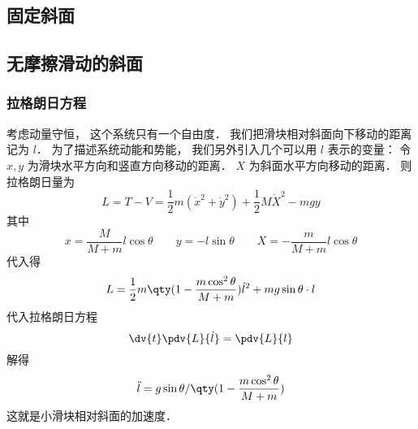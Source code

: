 
\subsection{固定斜面}

\subsection{无摩擦滑动的斜面}

\subsubsection{拉格朗日方程}
考虑动量守恒， 这个系统只有一个自由度． 我们把滑块相对斜面向下移动的距离记为 $l$． 为了描述系统动能和势能， 我们另外引入几个可以用 $l$ 表示的变量： 令 $x, y$ 为滑块水平方向和竖直方向移动的距离． $X$ 为斜面水平方向移动的距离． 则拉格朗日量为
\begin{equation}
L = T - V = \frac12 m(\dot x^2 + \dot y^2) + \frac12 M \dot X^2 - mgy
\end{equation}
其中
\begin{equation}
x = \frac{M}{M + m}l\cos\theta
\qquad
y = -l\sin\theta
\qquad
X = -\frac{m}{M + m}l\cos\theta
\end{equation}
代入得
\begin{equation}
L = \frac{1}{2}m \qty(1 - \frac{m\cos^2\theta}{M + m}) \dot l^2 + mg\sin\theta \cdot l
\end{equation}
代入拉格朗日方程
\begin{equation}
\dv{t} \pdv{L}{\dot l} = \pdv{L}{l}
\end{equation}
解得
\begin{equation}
\ddot l = g\sin\theta/\qty(1 - \frac{m\cos^2\theta}{M + m})
\end{equation}
这就是小滑块相对斜面的加速度．
